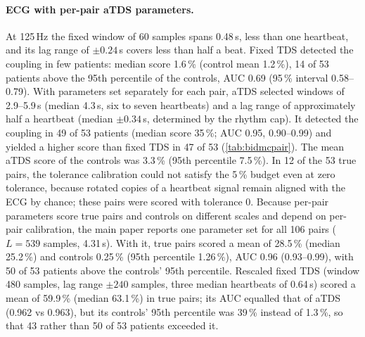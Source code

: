 \documentclass[11pt,a4paper]{article}
\begin{document}
\paragraph{ECG with per-pair aTDS parameters.} At 125\,Hz the fixed window of 60 samples spans 0.48\,s, less than one heartbeat, and its lag range of $\pm0.24$\,s covers less than half a beat. Fixed TDS detected the coupling in few patients: median score 1.6\,\% (control mean 1.2\,\%), 14 of 53 patients above the 95th percentile of the controls, AUC 0.69 (95\,\% interval 0.58--0.79). With parameters set separately for each pair, aTDS selected windows of 2.9--5.9\,s (median 4.3\,s, six to seven heartbeats) and a lag range of approximately half a heartbeat (median $\pm0.34$\,s, determined by the rhythm cap). It detected the coupling in 49 of 53 patients (median score 35\,\%; AUC 0.95, 0.90--0.99) and yielded a higher score than fixed TDS in 47 of 53 (\cref{tab:bidmcpair}). The mean aTDS score of the controls was 3.3\,\% (95th percentile 7.5\,\%). In 12 of the 53 true pairs, the tolerance calibration could not satisfy the 5\,\% budget even at zero tolerance, because rotated copies of a heartbeat signal remain aligned with the ECG by chance; these pairs were scored with tolerance 0. Because per-pair parameters score true pairs and controls on different scales and depend on per-pair calibration, the main paper reports one parameter set for all 106 pairs ($L = 539$ samples, 4.31\,s). With it, true pairs scored a mean of 28.5\,\% (median 25.2\,\%) and controls 0.25\,\% (95th percentile 1.26\,\%), AUC 0.96 (0.93--0.99), with 50 of 53 patients above the controls' 95th percentile. Rescaled fixed TDS (window 480 samples, lag range $\pm240$ samples, three median heartbeats of 0.64\,s) scored a mean of 59.9\,\% (median 63.1\,\%) in true pairs; its AUC equalled that of aTDS (0.962 vs 0.963), but its controls' 95th percentile was 39\,\% instead of 1.3\,\%, so that 43 rather than 50 of 53 patients exceeded it.
\end{document}
